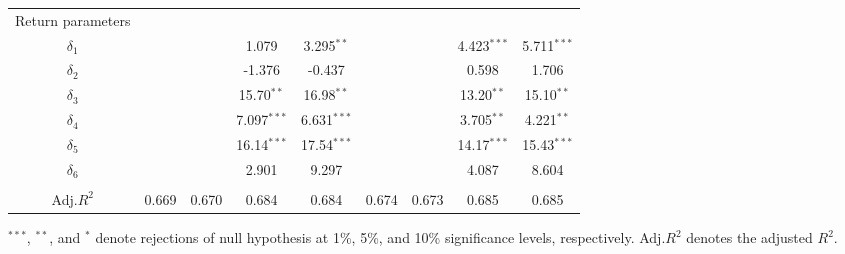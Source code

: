 \documentclass[10pt]{article}
\begin{document}
\begin{landscape}
\begin{center}
\begin{tabular}{c|cccc|cccc}
Return parameters&                        &                                 &           &             &           &           &               &                  \\
$\delta_1$  &                                 &                                 &1.079                              &3.295$^{\ast \ast }$         &                                 &                                   & 4.423$^{\ast \ast \ast}$ &5.711$^{\ast \ast \ast}$  \\
$\delta_2$  &                                 &                                 &-1.376                            &-0.437                             &                                 &                                  &  0.598                           &1.706                          \\  
$\delta_3$  &                                 &                                 &15.70$^{\ast \ast}$           &16.98$^{\ast \ast }$          &                                &                                   & 13.20$^{\ast\ast}$          &15.10$^{\ast\ast}$      \\
$\delta_4$  &                                 &                                 &7.097$^{\ast \ast \ast}$    &6.631$^{\ast \ast \ast}$     &                                &                                  & 3.705$^{\ast \ast}$         & 4.221$^{\ast\ast}$ \\
$\delta_5$  &                                 &                                 &16.14$^{\ast \ast \ast}$    &17.54$^{\ast \ast \ast}$     &                                &                                  & 14.17$^{\ast \ast \ast}$  & 15.43$^{\ast \ast \ast}$ \\
$\delta_6$  &                                 &                                 &2.901                              &9.297                              &                                 &                                  & 4.087                           & 8.604                          \\  
                &                                 &                                 &           &             &           &           &               &                  \\
Adj.$R^2$   & 0.669                         & 0.670                        &0.684                              &0.684                              &   0.674                       &  0.673                        & 0.685                            &  0.685                \\
    \hline 
   \end{tabular}
\end{center}
$^{***}$, $^{**}$, and $^{*}$ denote rejections of null hypothesis at 1\%, 5\%, and 10\% significance levels, respectively. Adj.$R^2$ denotes the adjusted $R^2$.
\end{landscape}
\end{document}
